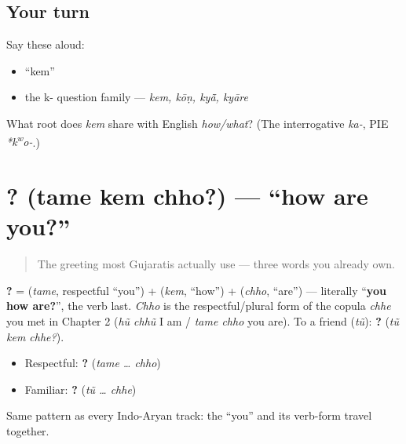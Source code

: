 \subsection*{Your turn}
Say these aloud:

\begin{itemize}
\raggedright
  \item \textquotedblleft{}kem\textquotedblright{}
  \item the k- question family — \emph{kem, kōṇ, kyā̃, kyāre}
\end{itemize}

\begin{tcolorbox}[breakable,colback=teal!4,colframe=teal!35!black,title={Before you move on}]
What root does \emph{kem} share with English \emph{how/what}? (The interrogative \emph{ka-}, PIE \emph{*k\textsuperscript{w}o-}.)
\end{tcolorbox}
\section[\gu{તમે} \gu{કેમ} \gu{છો}?]{  ? (tame kem chho?) — \textquotedblleft{}how are you?\textquotedblright{}}

\label{lesson:GU-C03-tame-kem-chho}



\begin{quote}
The greeting most Gujaratis actually use — three words you already own.
\end{quote}

\begin{cousinweb}
\textbf{  ?} = \textbf{} (\emph{tame}, respectful \textquotedblleft{}you\textquotedblright{}) + \textbf{} (\emph{kem}, \textquotedblleft{}how\textquotedblright{}) + \textbf{} (\emph{chho}, \textquotedblleft{}are\textquotedblright{}) — literally \textquotedblleft{}\textbf{you how are?}\textquotedblright{}, the verb last. \emph{Chho} is the respectful/plural form of the copula \emph{chhe} you met in Chapter 2 (\emph{hũ chhũ} I am / \emph{tame chho} you are). To a friend (\emph{tũ}): \textbf{  ?} (\emph{tũ kem chhe?}).
\end{cousinweb}

\begin{grammarlens}[title={Grammar Lens: match the \textquotedblleft{}you\textquotedblright{} to the copula}]
\begin{itemize}
\raggedright
  \item Respectful: \textbf{  ?} (\emph{tame … chho})
  \item Familiar: \textbf{  ?} (\emph{tũ … chhe})
\end{itemize}

Same pattern as every Indo-Aryan track: the \textquotedblleft{}you\textquotedblright{} and its verb-form travel together.
\end{grammarlens}

